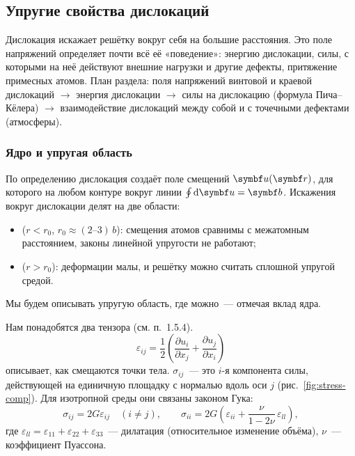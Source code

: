 \subsection{Упругие свойства дислокаций}\label{ssec:disl-elastic}

\begin{orientir}
Дислокация искажает решётку вокруг себя на большие расстояния. Это поле
напряжений определяет почти всё её «поведение»: энергию дислокации,
силы, с которыми на неё действуют внешние нагрузки и другие дефекты,
притяжение примесных атомов. План раздела: поля напряжений винтовой и
краевой дислокаций $\to$ энергия дислокации $\to$ силы на дислокацию
(формула Пича--Кёлера) $\to$ взаимодействие дислокаций между собой и с
точечными дефектами (атмосферы).
\end{orientir}

\subsubsection{Ядро и упругая область}

По определению дислокация создаёт поле смещений $\vb u(\vb r)$, для
которого на любом контуре вокруг линии $\oint\d\vb u=\vb b$. Искажения
вокруг дислокации делят на две области:
\begin{itemize}
\item {} ($r<r_0$, $r_0\approx(2\text{--}3)\,b$): смещения
атомов сравнимы с межатомным расстоянием, законы линейной упругости не
работают;
\item {} ($r>r_0$): деформации малы, и решётку можно
считать сплошной упругой средой.
\end{itemize}
Мы будем описывать упругую область, где можно~— отмечая вклад ядра.

Нам понадобятся два тензора (см. п.~1.5.4). 
\[
\varepsilon_{ij}=\frac12\left(\frac{\partial u_i}{\partial x_j}+\frac{\partial u_j}{\partial x_i}\right)
\]
описывает, как смещаются точки тела. 
$\sigma_{ij}$~— это $i$-я компонента силы, действующей на единичную
площадку с нормалью вдоль оси $j$ (рис.~\ref{fig:stress-comp}). Для
изотропной среды они связаны законом Гука:
\begin{equation}\label{eq:hooke}
\sigma_{ij}=2G\varepsilon_{ij}\quad(i\neq j),\qquad
\sigma_{ii}=2G\left(\varepsilon_{ii}+\frac{\nu}{1-2\nu}\,\varepsilon_{ll}\right),
\end{equation}
где $\varepsilon_{ll}=\varepsilon_{11}+\varepsilon_{22}+\varepsilon_{33}$~—
дилатация (относительное изменение объёма), $\nu$~— коэффициент Пуассона.

